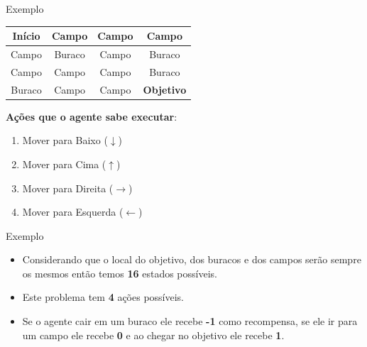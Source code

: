 \documentclass{beamer}
\begin{document}
\begin{frame}{Exemplo}
	\begin{center}
		\begin{tabular}{ |c|c|c|c| } 
			\hline
			\cellcolor{red!25} Início & Campo & Campo & Campo \\ 
			\hline
			Campo & \cellcolor{black!25} Buraco & Campo &  \cellcolor{black!25} Buraco\\ 
			\hline
			Campo & Campo & Campo & \cellcolor{black!25} Buraco\\ 
			\hline
			\cellcolor{black!25} Buraco & Campo & Campo & \textbf{Objetivo} \\ 
			\hline
		\end{tabular}
	\end{center}
	
	\vspace{0.2cm}
	\small
	\textbf{Ações que o agente sabe executar}: 
	\begin{enumerate}
		\item Mover para Baixo ($\downarrow$)
		\item Mover para Cima ($\uparrow$)
		\item Mover para Direita ($\rightarrow$)
		\item Mover para Esquerda ($\leftarrow$)
	\end{enumerate}
	
\end{frame}


\begin{frame}{Exemplo}
	\begin{itemize}
		\item Considerando que o local do objetivo, dos buracos e dos campos serão sempre 
		os mesmos então temos \textbf{16} estados possíveis. 
		\item Este problema tem \textbf{4} ações possíveis. 
		\item Se o agente cair em um buraco ele recebe \textbf{-1} como recompensa, se ele ir para um 
		campo ele recebe \textbf{0} e ao chegar no objetivo ele recebe \textbf{1}.  
		
	\end{itemize}
\end{frame}
\end{document}
